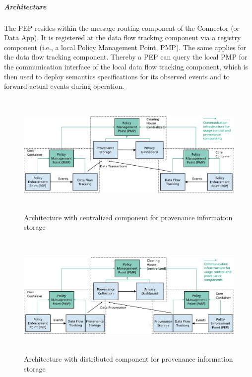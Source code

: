 \subparagraph*{Architecture\\}
The PEP resides within the message routing component of the  Connector (or Data App). It is registered at the data flow tracking component via a registry component (i.e., a local Policy Management Point, PMP). The same applies for the data flow tracking component. Thereby a PEP can query the local PMP for the communication interface of the local data flow tracking component, which is then used to deploy semantics specifications for its observed events and to forward actual events during operation.




\begin{figure}[H]
	\begin{Center}
		\includegraphics[width=6.53in,height=2.36in]{./media/image77.png}
		\caption{Architecture with centralized  component for provenance information storage}
		\label{fig:centralized_provenance}
	\end{Center}
\end{figure}






\begin{figure}[H]
	\begin{Center}
		\includegraphics[width=6.53in,height=2.37in]{./media/image78.png}
		\caption{Architecture with distributed component for provenance information storage}
		\label{fig:distributed_provenance_tracking}
	\end{Center}
\end{figure}


